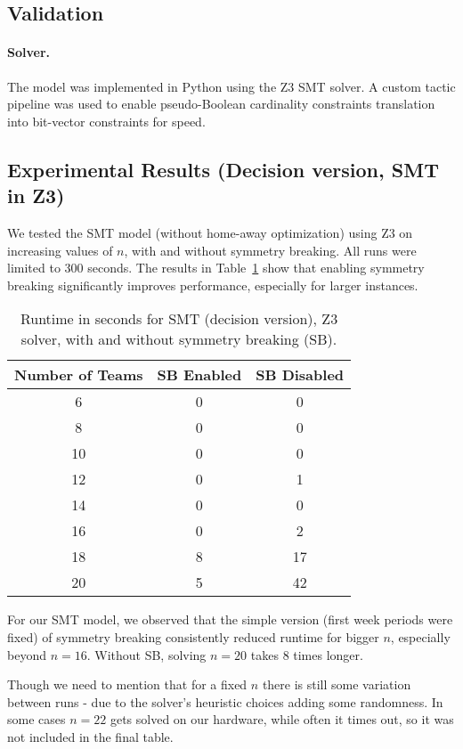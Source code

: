 \subsection{Validation}

\paragraph{Solver.}
The model was implemented in Python using the Z3 SMT solver. A custom tactic pipeline was used to enable pseudo-Boolean cardinality constraints translation into bit-vector constraints for speed.

\subsection*{Experimental Results (Decision version, SMT in Z3)}

We tested the SMT model (without home-away optimization) using Z3 on increasing values of $n$, with and without symmetry breaking. All runs were limited to 300 seconds. The results in Table~\ref{tab:smt-results} show that enabling symmetry breaking significantly improves performance, especially for larger instances.

\begin{table}[h!]
\centering
\caption{Runtime in seconds for SMT (decision version), Z3 solver, with and without symmetry breaking (SB).}
\label{tab:smt-results}
\begin{tabular}{|c|c|c|}
\hline
\textbf{Number of Teams} & \textbf{SB Enabled} & \textbf{SB Disabled} \\
\hline
6  & 0 & 0 \\
8  & 0 & 0 \\
10 & 0 & 0 \\
12 & 0 & 1 \\
14 & 0 & 0 \\
16 & 0 & 2 \\
18 & 8 & 17 \\
20 & 5 & 42 \\
\hline
\end{tabular}
\end{table}

For our SMT model, we observed that the simple version (first week periods were fixed) of symmetry breaking consistently reduced runtime for bigger $n$, especially beyond $n = 16$. Without SB, solving $n=20$ takes $8$ times longer.

Though we need to mention that for a fixed $n$ there is still some variation between runs - due to the solver's heuristic choices adding some randomness. In some cases $n = 22$ gets solved on our hardware, while often it times out, so it was not included in the final table.

